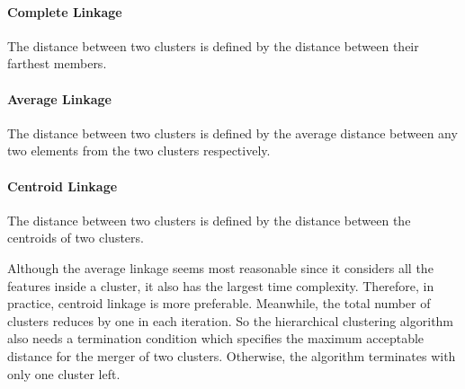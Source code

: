 \documentclass[twoside,11pt]{article}
\begin{document}
\paragraph{Complete Linkage}
The distance between two clusters is defined by the distance between their farthest members.
\paragraph{Average Linkage}
The distance between two clusters is defined by the average distance between any two elements from the two clusters respectively.
\paragraph{Centroid Linkage}
The distance between two clusters is defined by the distance between the centroids of two clusters.

Although the average linkage seems most reasonable since it considers all the features inside a cluster, it also has the largest time complexity. Therefore, in practice, centroid linkage is more preferable. Meanwhile, the total number of clusters reduces by one in each iteration. So the hierarchical clustering algorithm also needs a termination condition which specifies the maximum acceptable distance for the merger of two clusters. Otherwise, the algorithm terminates with only one cluster left.
\end{document}
